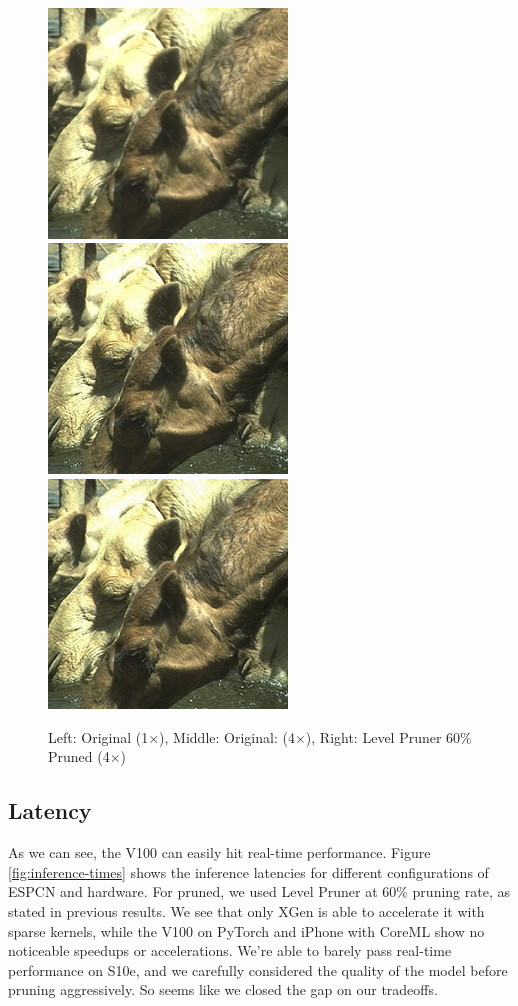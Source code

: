 \documentclass{article}
\begin{document}
\begin{figure}
    \centerline{\includegraphics[width=2.5in]{../final/figures/original_zoomed.png}\includegraphics[width=2.5in]{../final/figures/original4_zoomed.png}\includegraphics[width=2.5in]{../final/figures/levelpruner_zoomed.png}}
    \caption{Left: Original (1$\times$), Middle: Original: (4$\times$), Right: Level Pruner 60\% Pruned (4$\times$)}
    \label{fig:final-pruned-zoomed}
\end{figure}


\subsection{Latency}

As we can see, the V100 can easily hit real-time performance. 
Figure \ref{fig:inference-times} shows the inference latencies for different configurations of ESPCN and hardware. For pruned, we used Level Pruner at 60\% pruning rate, as stated in previous results. We see that only XGen is able to accelerate it with sparse kernels, while the V100 on PyTorch and iPhone with CoreML show no noticeable speedups or accelerations. We're able to barely pass real-time performance on S10e, and we carefully considered the quality of the model before pruning aggressively. So seems like we closed the gap on our tradeoffs. 
\end{document}
